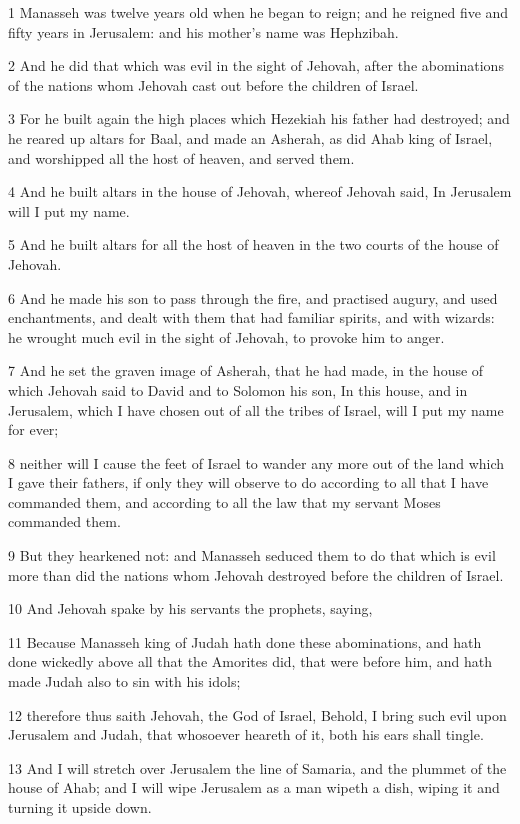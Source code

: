 \par 1 Manasseh was twelve years old when he began to reign; and he reigned five and fifty years in Jerusalem: and his mother's name was Hephzibah.
\par 2 And he did that which was evil in the sight of Jehovah, after the abominations of the nations whom Jehovah cast out before the children of Israel.
\par 3 For he built again the high places which Hezekiah his father had destroyed; and he reared up altars for Baal, and made an Asherah, as did Ahab king of Israel, and worshipped all the host of heaven, and served them.
\par 4 And he built altars in the house of Jehovah, whereof Jehovah said, In Jerusalem will I put my name.
\par 5 And he built altars for all the host of heaven in the two courts of the house of Jehovah.
\par 6 And he made his son to pass through the fire, and practised augury, and used enchantments, and dealt with them that had familiar spirits, and with wizards: he wrought much evil in the sight of Jehovah, to provoke him to anger.
\par 7 And he set the graven image of Asherah, that he had made, in the house of which Jehovah said to David and to Solomon his son, In this house, and in Jerusalem, which I have chosen out of all the tribes of Israel, will I put my name for ever;
\par 8 neither will I cause the feet of Israel to wander any more out of the land which I gave their fathers, if only they will observe to do according to all that I have commanded them, and according to all the law that my servant Moses commanded them.
\par 9 But they hearkened not: and Manasseh seduced them to do that which is evil more than did the nations whom Jehovah destroyed before the children of Israel.
\par 10 And Jehovah spake by his servants the prophets, saying,
\par 11 Because Manasseh king of Judah hath done these abominations, and hath done wickedly above all that the Amorites did, that were before him, and hath made Judah also to sin with his idols;
\par 12 therefore thus saith Jehovah, the God of Israel, Behold, I bring such evil upon Jerusalem and Judah, that whosoever heareth of it, both his ears shall tingle.
\par 13 And I will stretch over Jerusalem the line of Samaria, and the plummet of the house of Ahab; and I will wipe Jerusalem as a man wipeth a dish, wiping it and turning it upside down.
